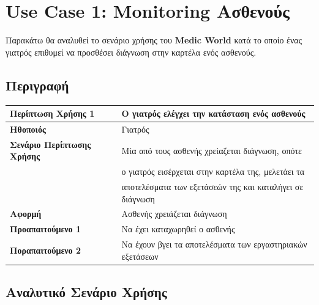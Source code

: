 \documentclass{article}
\newcommand\T{\rule{0pt}{2.6ex}}       %
\newcommand\B{\rule[-1.2ex]{0pt}{0pt}}
\begin{document}
        \vspace{0.5cm}

\section{Use Case 1: Monitoring Ασθενούς}

Παρακάτω θα αναλυθεί το σενάριο χρήσης του \textbf{Medic World} κατά το οποίο ένας γιατρός επιθυμεί να προσθέσει διάγνωση στην καρτέλα ενός ασθενούς.

\subsection{Περιγραφή}

\begin{center}
     \begin{tabular}{|l|l|}
     \hline
      \textbf{Περίπτωση Χρήσης 1 }   & Ο γιατρός ελέγχει την κατάσταση ενός ασθενούς \T\B \\ 
      \hline
      \textbf{Ηθοποιός} & Γιατρός \T\B \\
      \hline
      \textbf{Σενάριο Περίπτωσης Χρήσης} & Μία από τους ασθενής χρείαζεται διάγνωση, οπότε\\& ο γιατρός εισέρχεται στην καρτέλα της, μελετάει τα\\& αποτελέσματα των εξετάσεών της και καταλήγει σε διάγνωση\T\B \\
      \hline
      \textbf{Αφορμή} & Ασθενής χρειάζεται διάγνωση \T\B \\
      \hline
      \textbf{Προαπαιτούμενο 1} & Να έχει καταχωρηθεί ο ασθενής \T\B \\
      \hline
      \textbf{Ποραπαιτούμενο 2} & Να έχουν βγει τα αποτελέσματα των εργαστηριακών εξετάσεων \T\B \\
      \hline
     \end{tabular}
 \end{center}
 
 \subsection{Αναλυτικό Σενάριο Χρήσης}
 
\end{document}
